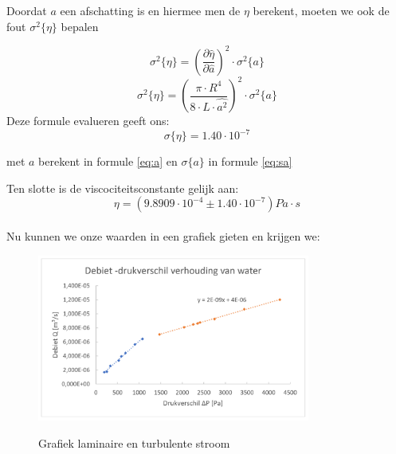 Doordat $a$ een afschatting is en hiermee men de $\eta$ berekent,
moeten we ook de fout $\sigma ^2 \{ \eta \}$ bepalen

\begin{equation}
    \sigma ^2 \{ \eta \} = \left(\frac{\partial \hat{\eta}}{\partial \hat{a}}\right)^2 \cdot \sigma ^2 \{a\}
\end{equation}
\begin{equation*}
    \sigma ^2 \{ \eta \} = \left(\frac{\pi \cdot R^4}{8 \cdot L \cdot \hat{a^2}}\right)^2 \cdot \sigma ^2 \{a\}
\end{equation*}
Deze formule evalueren geeft ons:
\begin{equation*}
    \sigma \{ \eta \} = 1.40 \cdot 10^{-7}
\end{equation*}

met $a$ berekent in formule \eqref{eq:a} en $\sigma \{a\}$ in formule \eqref{eq:sa}

Ten slotte is de viscociteitsconstante gelijk aan:
\begin{equation*}
    \eta = (9.8909 \cdot 10^{-4} \pm 1.40 \cdot 10^{-7})Pa \cdot s
\end{equation*}\\

Nu kunnen we onze waarden in een grafiek gieten en krijgen we:
\begin{figure}[H]
    \centering
    \caption{Grafiek laminaire en turbulente stroom}
    \includegraphics[width=0.8\textwidth]{img/grafiek.png}
    \label{fig:grafiek}
\end{figure}



